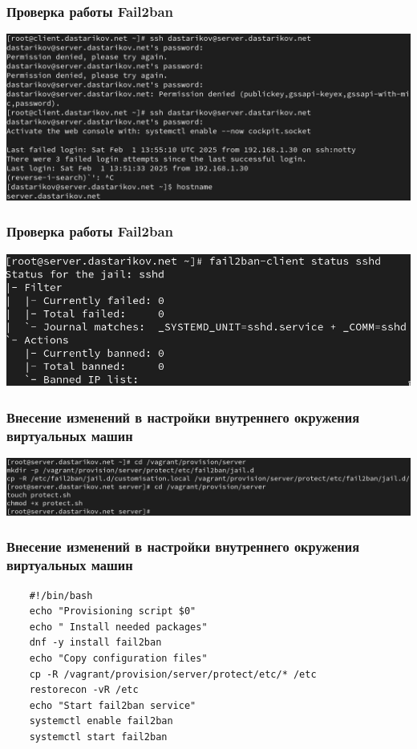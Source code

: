 \begin{frame}
\frametitle{Проверка работы Fail2ban}
    \centering
    \includegraphics[width=\textwidth]{../images/image16.png}
\end{frame}

\begin{frame}
\frametitle{Проверка работы Fail2ban}
    \centering
    \includegraphics[width=\textwidth]{../images/image17.png}
\end{frame}




\begin{frame}
\frametitle{Внесение изменений в настройки внутреннего окружения виртуальных машин}
    \centering
    \includegraphics[width=\textwidth]{../images/image18.png}
\end{frame}

\begin{frame}[fragile]
\frametitle{Внесение изменений в настройки внутреннего окружения виртуальных машин}
\begin{verbatim}
    #!/bin/bash
    echo "Provisioning script $0"
    echo " Install needed packages"
    dnf -y install fail2ban
    echo "Copy configuration files"
    cp -R /vagrant/provision/server/protect/etc/* /etc
    restorecon -vR /etc
    echo "Start fail2ban service"
    systemctl enable fail2ban
    systemctl start fail2ban
\end{verbatim}
\end{frame}

